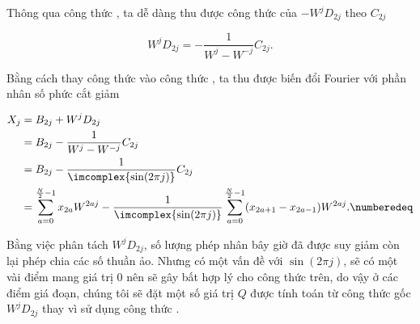 				Thông qua công thức , ta dễ dàng thu được công thức của $- W^j D_{2j}$ theo $C_{2j}$
				
					\begin{equation}
						W^j D_{2j} = - \frac{1}{W^j - W^{-j}} C_{2j}.
					\label{fft::rader_brenner_d_c_formula}
					\end{equation}
				
				Bằng cách thay công thức  vào công thức , ta thu được biến đổi Fourier với phần nhân số phức cắt giảm
				
					\begin{align*}
						X_{j}	& = B_{2j} + W^j D_{2j} \\
								& = B_{2j} - \frac{1}{W^j - W^{-j}} C_{2j} \\
								& = B_{2j} - \frac{1}{\imcomplex{\sin(2\pi j)}} C_{2j} \\
								& = \sum_{a=0}^{\frac{N}{2} - 1} x_{2a} W^{2aj} - \frac{1}{\imcomplex{\sin(2\pi j)}} \sum_{a=0}^{\frac{N}{2} - 1} (x_{2a + 1} - x_{2a - 1}) W^{2aj}. \numberedeq
						\label{fft::rader_brenner_final}
					\end{align*}
				
				Bằng việc phân tách $W^j D_{2j}$, số lượng phép nhân bây giờ đã được suy giảm còn lại phép chia các số thuần ảo. Nhưng có một vấn đề với $\sin(2\pi j)$, sẽ có một vài điểm mang giá trị $0$ nên sẽ gây bất hợp lý cho công thức trên, do vậy ở các điểm giá đoạn, chúng tôi sẽ đặt một số giá trị $Q$ được tính toán từ công thức gốc $W^j D_{2j}$ thay vì sử dụng công thức .
				
				
